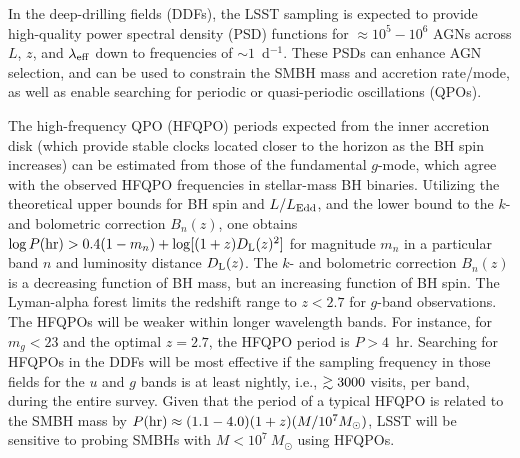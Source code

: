 In the deep-drilling fields (DDFs), the LSST sampling is expected to provide
high-quality power spectral density (PSD) functions for $\approx10^{5} - 10^{6}$
AGNs across $L$, $z$, and $\lambda_{\rm eff}$ down to frequencies of
$\sim1$~d$^{-1}$. These PSDs can enhance AGN selection, and can be used to
constrain the SMBH mass and accretion rate/mode, as well as enable searching for
periodic or quasi-periodic oscillations (QPOs).

%
%


The high-frequency QPO (HFQPO) periods expected from the inner accretion disk
(which provide stable clocks located closer to the horizon as the BH spin increases)
can be estimated from those of the fundamental $g$-mode, which agree with
the observed HFQPO frequencies in stellar-mass BH binaries. Utilizing the
theoretical upper bounds for BH spin and $L/L_{\rm Edd}$, and the lower
bound to the $k$- and bolometric correction $B_n(z)$, one obtains
$\log P({\rm hr}) > 0.4(1-m_n) + \log[(1+z)D_{\rm L}(z)^2]$ for magnitude
$m_n$ in a particular band $n$ and luminosity distance $D_{\rm L}(z)$.
The $k$- and bolometric correction $B_n(z)$ is a decreasing function of BH mass,
but an increasing function of BH spin. The Lyman-alpha forest limits the redshift
range to $z < 2.7$ for $g$-band observations. The HFQPOs will be weaker within longer
wavelength bands.
For instance, for $m_g  <  23$ and the optimal $z =  2.7$, the HFQPO period is $P > 4$~hr.
%
Searching for HFQPOs in the DDFs will be most effective if the sampling frequency
in those fields for the $u$ and $g$ bands is at least nightly, i.e., $\gtrsim3000$
visits, per band, during the entire survey. Given that the period of a typical HFQPO is
related to the SMBH mass by $P({\rm hr}) \approx (1.1-4.0)(1+z)(M/10^{7}M_{\odot})$,
LSST will be sensitive to probing SMBHs with $M < 10^{7}~M_{\odot}$ using HFQPOs.

